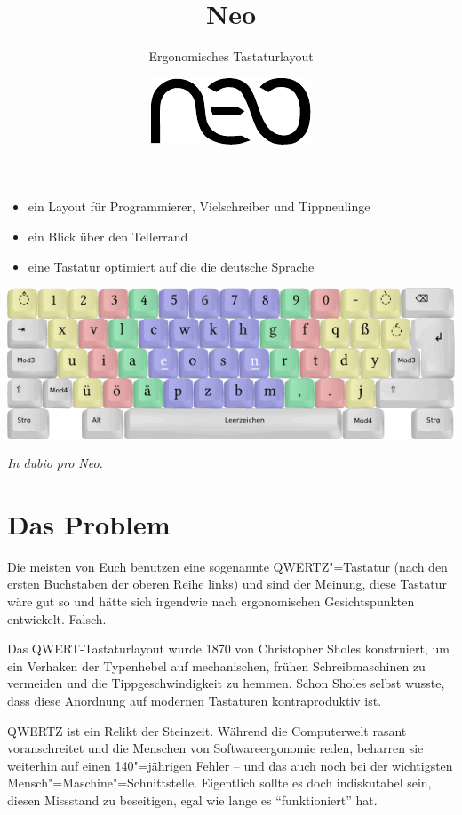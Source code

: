 \documentclass[%
  a4paper
  ,ngerman
  ,notumble
]{leaflet}
\title{Neo}
\author{Ergonomisches Tastaturlayout}
\date{\includegraphics[height=3ex]{neo_logo}}
\begin{document}
\maketitle
\begin{itemize}%
\item ein Layout für Programmierer, Vielschreiber und Tippneulinge
\item ein Blick über den Tellerrand
\item eine Tastatur optimiert auf die die deutsche Sprache
\end{itemize}%

\vfill

\includegraphics[width=\textwidth]{tastatur_neo_Ebene1}

\vfill

\begin{center}
\emph{In dubio pro Neo}.
\end{center}
\newpage
\section{Das Problem}

Die meisten von Euch benutzen eine sogenannte QWERTZ"=Tastatur (nach den ersten Buchstaben der oberen Reihe links) und sind der Meinung, diese Tastatur wäre gut so und hätte sich irgendwie nach ergonomischen Gesichtspunkten entwickelt. Falsch.

Das QWERT-Tastaturlayout wurde 1870 von Christopher Sholes konstruiert, um ein Verhaken der Typenhebel auf mechanischen, frühen Schreibmaschinen zu vermeiden und die Tippgeschwindigkeit zu hemmen. Schon Sholes selbst wusste, dass diese Anordnung auf modernen Tastaturen kontraproduktiv ist.

QWERTZ ist ein Relikt der Steinzeit. Während die Computerwelt rasant voranschreitet und die Menschen von Softwareergonomie reden, beharren sie weiterhin auf einen 140"=jährigen Fehler -- und das auch noch bei der wichtigsten Mensch"=Maschine"=Schnittstelle. Eigentlich sollte es doch indiskutabel sein, diesen Missstand zu beseitigen, egal wie lange es \enquote{funktioniert} hat.
\end{document}
